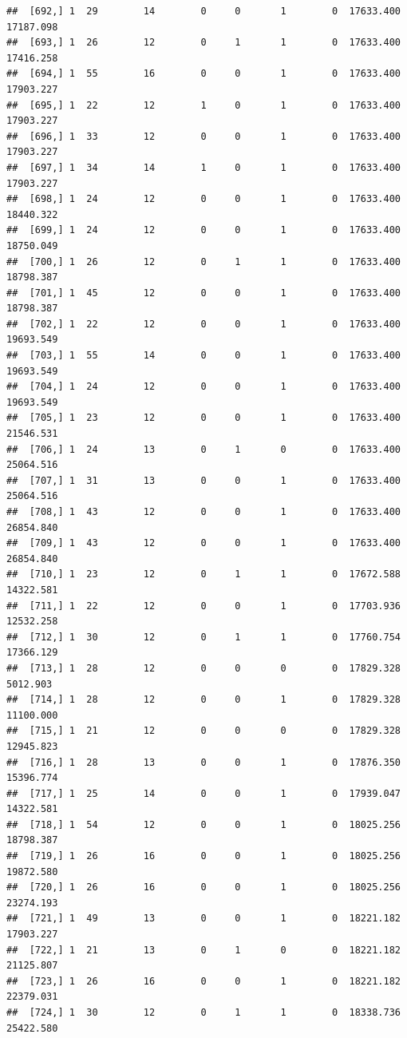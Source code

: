 \documentclass[
]{article}
\begin{document}
\begin{verbatim}
##  [692,] 1  29        14        0     0       1        0  17633.400  17187.098
##  [693,] 1  26        12        0     1       1        0  17633.400  17416.258
##  [694,] 1  55        16        0     0       1        0  17633.400  17903.227
##  [695,] 1  22        12        1     0       1        0  17633.400  17903.227
##  [696,] 1  33        12        0     0       1        0  17633.400  17903.227
##  [697,] 1  34        14        1     0       1        0  17633.400  17903.227
##  [698,] 1  24        12        0     0       1        0  17633.400  18440.322
##  [699,] 1  24        12        0     0       1        0  17633.400  18750.049
##  [700,] 1  26        12        0     1       1        0  17633.400  18798.387
##  [701,] 1  45        12        0     0       1        0  17633.400  18798.387
##  [702,] 1  22        12        0     0       1        0  17633.400  19693.549
##  [703,] 1  55        14        0     0       1        0  17633.400  19693.549
##  [704,] 1  24        12        0     0       1        0  17633.400  19693.549
##  [705,] 1  23        12        0     0       1        0  17633.400  21546.531
##  [706,] 1  24        13        0     1       0        0  17633.400  25064.516
##  [707,] 1  31        13        0     0       1        0  17633.400  25064.516
##  [708,] 1  43        12        0     0       1        0  17633.400  26854.840
##  [709,] 1  43        12        0     0       1        0  17633.400  26854.840
##  [710,] 1  23        12        0     1       1        0  17672.588  14322.581
##  [711,] 1  22        12        0     0       1        0  17703.936  12532.258
##  [712,] 1  30        12        0     1       1        0  17760.754  17366.129
##  [713,] 1  28        12        0     0       0        0  17829.328   5012.903
##  [714,] 1  28        12        0     0       1        0  17829.328  11100.000
##  [715,] 1  21        12        0     0       0        0  17829.328  12945.823
##  [716,] 1  28        13        0     0       1        0  17876.350  15396.774
##  [717,] 1  25        14        0     0       1        0  17939.047  14322.581
##  [718,] 1  54        12        0     0       1        0  18025.256  18798.387
##  [719,] 1  26        16        0     0       1        0  18025.256  19872.580
##  [720,] 1  26        16        0     0       1        0  18025.256  23274.193
##  [721,] 1  49        13        0     0       1        0  18221.182  17903.227
##  [722,] 1  21        13        0     1       0        0  18221.182  21125.807
##  [723,] 1  26        16        0     0       1        0  18221.182  22379.031
##  [724,] 1  30        12        0     1       1        0  18338.736  25422.580

\end{verbatim}
\end{document}
